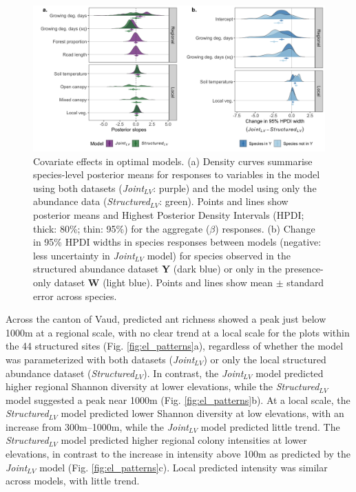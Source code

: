 \documentclass[preprint,review,times,12pt]{elsarticle}
\begin{document}
\begin{figure}
\centering\includegraphics[width=6in]{ms/1_Ecography/1/figs/slope_means+HDI_LV.png}
\caption{\label{fig:slope_means} Covariate effects in optimal models. (a) Density curves summarise species-level posterior means for responses to variables in the model using both datasets (\emph{Joint}$_{LV}$: purple) and the model using only the abundance data (\emph{Structured}$_{LV}$: green). Points and lines show posterior means and Highest Posterior Density Intervals (HPDI; thick: 80\%; thin: 95\%) for the aggregate ($\beta$) responses. (b) Change in 95\% HPDI widths in species responses between models (negative: less uncertainty in \emph{Joint}$_{LV}$ model) for species observed in the structured abundance dataset \textbf{Y} (dark blue) or only in the presence-only dataset \textbf{W} (light blue). Points and lines show mean $\pm$ standard error across species. }
\end{figure}

Across the canton of Vaud, predicted ant richness showed a peak just below 1000m at a regional scale, with no clear trend at a local scale for the plots within the 44 structured sites (Fig. \ref{fig:el_patterns}a), regardless of whether the model was parameterized with both datasets (\emph{Joint}$_{LV}$) or only the local structured abundance dataset (\emph{Structured}$_{LV}$). In contrast, the \emph{Joint}$_{LV}$ model predicted higher regional Shannon diversity at lower elevations, while the \emph{Structured}$_{LV}$ model suggested a peak near 1000m (Fig. \ref{fig:el_patterns}b). At a local scale, the \emph{Structured}$_{LV}$ model predicted lower Shannon diversity at low elevations, with an increase from 300m–1000m, while the \emph{Joint}$_{LV}$ model predicted little trend. The \emph{Structured}$_{LV}$ model predicted higher regional colony intensities at lower elevations, in contrast to the increase in intensity above 100m as predicted by the \emph{Joint}$_{LV}$ model (Fig. \ref{fig:el_patterns}c). Local predicted intensity was similar across models, with little trend. 
\end{document}
